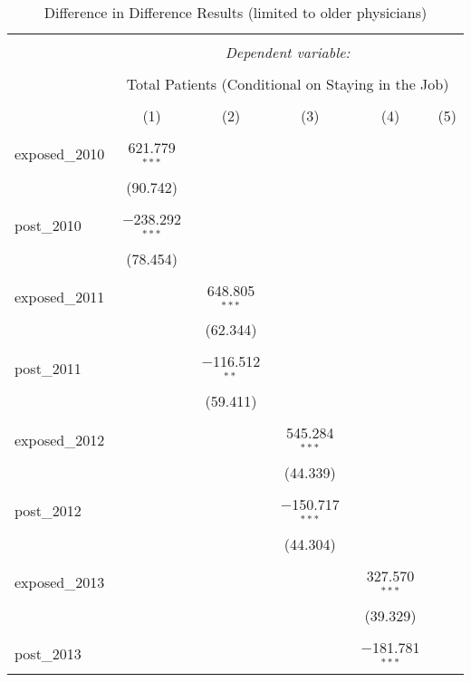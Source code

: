 
\begin{table}[!htbp] \centering 
  \caption{Difference in Difference Results (limited to older physicians)} 
  \label{} 
  \begin{adjustbox}{width=\textwidth}
\begin{tabular}{@{\extracolsep{5pt}}lccccc} 
\\[-1.8ex]\hline 
\hline \\[-1.8ex] 
 & \multicolumn{5}{c}{\textit{Dependent variable:}} \\ 
\cline{2-6} 
\\[-1.8ex] & \multicolumn{5}{c}{Total Patients (Conditional on Staying in the Job)} \\ 
\\[-1.8ex] & (1) & (2) & (3) & (4) & (5)\\ 
\hline \\[-1.8ex] 
 exposed\_2010 & 621.779$^{***}$ &  &  &  &  \\ 
  & (90.742) &  &  &  &  \\ 
  & & & & & \\ 
 post\_2010 & $-$238.292$^{***}$ &  &  &  &  \\ 
  & (78.454) &  &  &  &  \\ 
  & & & & & \\ 
 exposed\_2011 &  & 648.805$^{***}$ &  &  &  \\ 
  &  & (62.344) &  &  &  \\ 
  & & & & & \\ 
 post\_2011 &  & $-$116.512$^{**}$ &  &  &  \\ 
  &  & (59.411) &  &  &  \\ 
  & & & & & \\ 
 exposed\_2012 &  &  & 545.284$^{***}$ &  &  \\ 
  &  &  & (44.339) &  &  \\ 
  & & & & & \\ 
 post\_2012 &  &  & $-$150.717$^{***}$ &  &  \\ 
  &  &  & (44.304) &  &  \\ 
  & & & & & \\ 
 exposed\_2013 &  &  &  & 327.570$^{***}$ &  \\ 
  &  &  &  & (39.329) &  \\ 
  & & & & & \\ 
 post\_2013 &  &  &  & $-$181.781$^{***}$ &  \\ 

\end{tabular}
\end{adjustbox}
\end{table}
